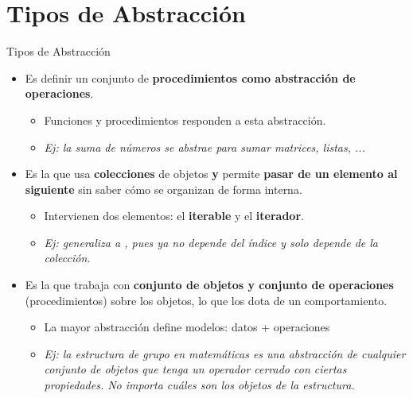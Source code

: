 \documentclass[10pt,envcountsect,spanish]{beamer}
\begin{document}
\section{Tipos de Abstracción}

\begin{frame}[fragile]{Tipos de Abstracción}


\begin{itemize}%
\item {} Es definir un conjunto de\textbf{ procedimientos como abstracción de operaciones}. 

\begin{itemize}
\item 
Funciones y procedimientos responden a esta abstracción.

\item 
\textit{\footnotesize Ej: la suma de números se abstrae para sumar matrices, listas, ...}
\end{itemize}


\item {} Es la que usa \textbf{colecciones} de objetos \textbf{y} permite \textbf{pasar de un elemento al siguiente} sin saber cómo se organizan de forma interna. 

\begin{itemize}
\item 
Intervienen dos elementos: el \textbf{iterable} y el \textbf{iterador}.

\item \textit{\footnotesize Ej:  generaliza  a , pues ya no depende del índice y solo depende de la colección.}
\end{itemize}


\item {} Es la que trabaja con \textbf{conjunto de objetos y  conjunto de operaciones} (procedimientos) sobre los objetos, lo que los dota de un comportamiento. 

\begin{itemize}
\item La mayor abstracción define modelos: datos + operaciones

\item 
\textit{Ej: la estructura de grupo en matemáticas es una abstracción de cualquier conjunto de objetos que tenga un operador cerrado con ciertas propiedades.  No importa cuáles son los objetos de la estructura.}
\end{itemize}


\end{itemize}

\end{frame}
\end{document}
